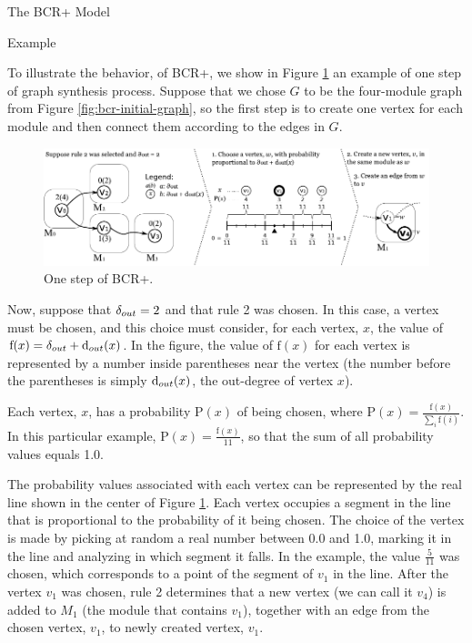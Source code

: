 \documentclass[11pt,twocolumn,a4paper,english]{article}
\begin{document}
\begin{section}{The BCR+ Model}
\begin{subsection}{Example}
	
	To illustrate the behavior, of BCR+, we show in Figure \ref{fig:bcr-example} an example of one step of graph synthesis process. Suppose that we chose $G$ to be the four-module graph from Figure \ref{fig:bcr-initial-graph}, so the first step is to create one vertex for each module and then connect them according to the edges in $G$. 
	
\begin{figure}[htbp]
	\centering
		\includegraphics[width=\textwidth]{figures/bcr-example}
	\caption{One step of BCR+.}
	\label{fig:bcr-example}
\end{figure}
	
	Now, suppose that $\delta_{out} = 2$ and that rule 2 was chosen. In this case, a vertex must be chosen, and this choice must consider, for each vertex, $x$, the value of $\mathrm{f}(x) = \delta_{out} + \mathrm{d}_{out}(x)$. In the figure, the value of $\mathrm{f}(x)$ for each vertex is represented by a number inside parentheses near the vertex (the number before the parentheses is simply $\mathrm{d}_{out}(x)$, the out-degree of vertex $x$).
	
	Each vertex, $x$, has a probability $\mathrm{P}(x)$ of being chosen, where $\mathrm{P}(x) = \frac{\mathrm{f}(x)}{\sum_i \mathrm{f}(i)}$. In this particular example, $\mathrm{P}(x) = \frac{\mathrm{f}(x)}{11}$, so that the sum of all probability values equals 1.0.
	
	The probability values associated with each vertex can be represented by the real line shown in the center of Figure \ref{fig:bcr-example}. Each vertex occupies a segment in the line that is proportional to the probability of it being chosen. The choice of the vertex is made by picking at random a real number between 0.0 and 1.0, marking it in the line and analyzing in which segment it falls. In the example, the value $\frac{5}{11}$ was chosen, which corresponds to a point of the segment of $v_1$ in the line. After the vertex $v_1$ was chosen, rule 2 determines that a new vertex (we can call it $v_4$) is added to $M_1$ (the module that contains $v_1$), together with an edge from the chosen vertex, $v_1$, to newly created vertex, $v_1$.
	

\end{subsection}
\end{section}
\end{document}
